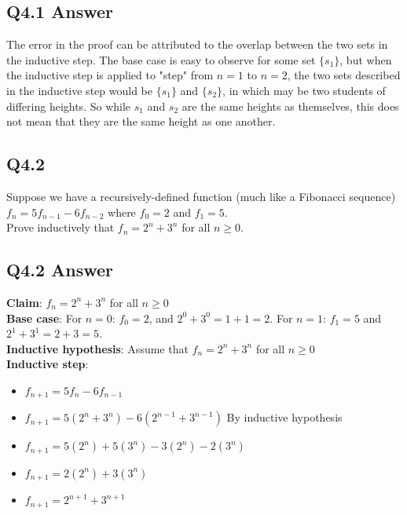 \documentclass{article}
\begin{document}
\subsection*{Q4.1 Answer}
The error in the proof can be attributed to the overlap between the two sets in the inductive step. The base case is easy to observe for some set $\{s_1\}$, but when the inductive step is applied to "step" from $n=1$ to $n=2$, the two sets described in the inductive step would be $\{s_1\}$ and $\{s_2\}$, in which may be two students of differing heights. So while $s_1$ and $s_2$ are the same heights as themselves, this does not mean that they are the same height as one another.
\newpage
{}
\subsection*{Q4.2}
Suppose we have a recursively-defined function (much like a Fibonacci sequence) $f_n=5f_{n-1}-6f_{n-2}$ where $f_0=2$ and $f_1=5$.
\\ Prove inductively that $f_n=2^n+3^n$ for all $n\geq0$.
\newpage
{}
\subsection*{Q4.2 Answer}
\textbf{Claim}: $f_n=2^n+3^n$ for all $n\geq0$
\\ \textbf{Base case}: For $n=0$: $f_0=2$, and $2^0+3^0=1+1=2$. For $n=1$: $f_1=5$ and $2^1+3^1=2+3=5$.
\\ \textbf{Inductive hypothesis}: Assume that $f_n=2^n+3^n$ for all $n\geq0$
\\ \textbf{Inductive step}:
\begin{itemize}[label=]
    \item $f_{n+1}=5f_n-6f_{n-1}$
    \item $f_{n+1}=5(2^n+3^n)-6(2^{n-1}+3^{n-1})$ By inductive hypothesis
    \item $f_{n+1}=5(2^n)+5(3^n)-3(2^n)-2(3^n)$
    \item $f_{n+1}=2(2^n)+3(3^n)$
    \item $f_{n+1}=2^{n+1}+3^{n+1}$
\end{itemize}
\newpage
{}
\end{document}
